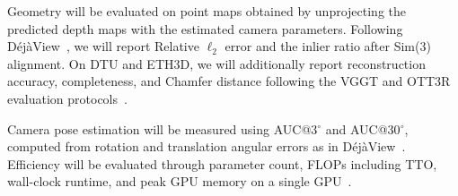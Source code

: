 Geometry will be evaluated on point maps obtained by unprojecting the predicted depth maps with the estimated camera parameters. Following DéjàView~\cite{dejaview}, we will report Relative $\ell_2$ error and the inlier ratio after Sim(3) alignment. On DTU and ETH3D, we will additionally report reconstruction accuracy, completeness, and Chamfer distance following the VGGT and OTT3R evaluation protocols~\cite{vggt,ott3r}.

Camera pose estimation will be measured using AUC@3$^\circ$ and AUC@30$^\circ$, computed from rotation and translation angular errors as in DéjàView~\cite{dejaview}. Efficiency will be evaluated through parameter count, FLOPs including TTO, wall-clock runtime, and peak GPU memory on a single GPU~\cite{dejaview}.

